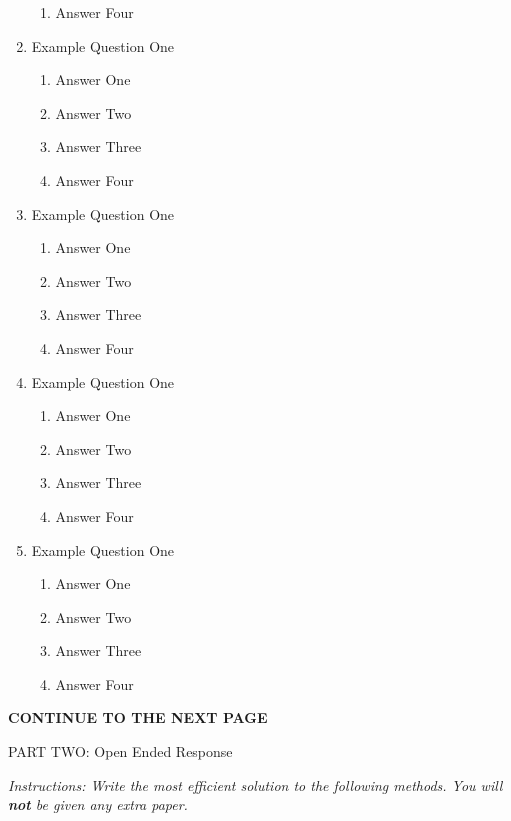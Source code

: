 \documentclass[11pt,fleqn]{article}
\begin{document}
\begin{enumerate}
\begin{enumerate}
	\item Answer Four
	\end{enumerate}
\item Example Question One
	\begin{enumerate}
	\item Answer One
	\item Answer Two
	\item Answer Three
	\item Answer Four
	\end{enumerate}
\item Example Question One
	\begin{enumerate}
	\item Answer One
	\item Answer Two
	\item Answer Three
	\item Answer Four
	\end{enumerate}
\item Example Question One
	\begin{enumerate}
	\item Answer One
	\item Answer Two
	\item Answer Three
	\item Answer Four
	\end{enumerate}
\item Example Question One
	\begin{enumerate}
	\item Answer One
	\item Answer Two
	\item Answer Three
	\item Answer Four
	\end{enumerate}
\end{enumerate}

\vfill
\begin{center}
\textbf{CONTINUE TO THE NEXT PAGE}
\end{center}

\newpage

\begin{center}
\begin{large}
PART TWO: Open Ended Response
\end{large}
\end{center}
\textit{Instructions: Write the most efficient solution to the following methods. You will \textbf{not} be given any extra paper.}
\end{document}
